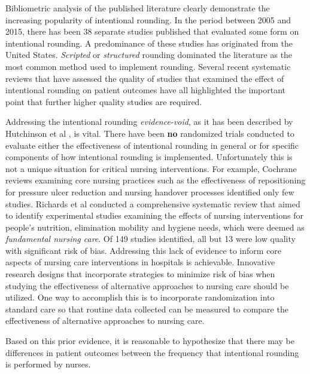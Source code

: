 \documentclass[12pt]{article}
\begin{document}
Bibliometric analysis of the published literature clearly demonstrate the increasing popularity of intentional rounding.\cite{hutchinson2017mapping} In the period between 2005 and 2015, there has been 38 separate studies published that evaluated some form on intentional rounding. A predominance of these studies has originated from the United States. \textit{Scripted} or \textit{structured} rounding dominated the literature as the most common method used to implement rounding. Several recent systematic reviews that have assessed the quality of studies that examined the effect of intentional rounding on patient outcomes have all highlighted the important point that further higher quality studies are required.\cite{christiansen2018intentional, toole2016systematic, hutchinson2017mapping, sims2018realist, flowers2016intentional} 

Addressing the  intentional rounding \textit{evidence-void}, as it has been described by Hutchinson et al \cite{hutchinson2016intentional}, is vital. There have been \textbf{no} randomized trials conducted to evaluate either the effectiveness of intentional rounding in general or for specific components of how intentional rounding is implemented. Unfortunately this is not a unique situation for critical nursing interventions. For example, Cochrane reviews examining core nursing practices such as the effectiveness of repositioning for pressure ulcer reduction \cite{gillespie2014repositioning} and nursing handover processes\cite{lockwood2016best} identified only few studies. Richards et al\cite{richards2018fundamental} conducted a comprehensive systematic review that aimed to identify experimental studies examining the effects of nursing interventions for people's nutrition, elimination mobility and hygiene needs, which were deemed as \textit{fundamental nursing care}. Of 149 studies identified, all but 13 were low quality with significant risk of bias. Addressing this lack of evidence to inform core aspects of nursing care interventions in hospitals is achievable. Innovative research designs that incorporate strategies to minimize risk of bias when studying the effectiveness of alternative approaches to nursing care should be utilized. One way to accomplish this is to incorporate randomization into standard care so that routine data collected can be measured to compare the effectiveness of alternative approaches to nursing care. 

Based on this prior evidence, it is reasonable to hypothesize that there may be differences in patient outcomes between the frequency that intentional rounding is performed by nurses. 
\end{document}
